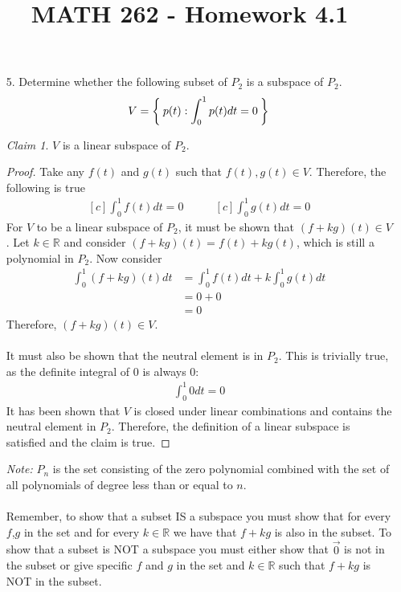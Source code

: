 \documentclass[letterpaper,12pt]{article}
\author{}
\title{MATH 262 - Homework 4.1}
\date{} %
\theoremstyle{remark}
\newtheorem*{claim}{Claim}
\begin{document}
\maketitle

\begin{enumerate}
  \item[5.]
    Determine whether the following subset of $P_2$ is a subspace of $P_2$.
    \begin{align*}
      V = \Set{p(t): \int_0^1 p(t)dt = 0}
    \end{align*}
    \begin{claim}
      $V$ is a linear subspace of $P_2$.
    \end{claim}
    \begin{proof}
      Take any $f(t)$ and $g(t)$ such that $f(t),g(t) \in V$. Therefore, the following is true
      \begin{equation*}
        \begin{aligned}[c]
          \int_0^1 f(t)dt = 0
        \end{aligned}
        \qquad
        \begin{aligned}[c]
          \int_0^1 g(t)dt = 0
        \end{aligned}
      \end{equation*}
      For $V$ to be a linear subspace of $P_2$, it must be shown that $(f + kg)(t) \in V$. Let $k \in \mathbb{R}$ and consider $(f + kg)(t) = f(t) + kg(t)$, which is still a polynomial in $P_2$. Now consider
      \begin{align*}
        \int_0^1 (f + kg)(t)dt &= \int_0^1 f(t)dt + k\int_0^1 g(t)dt \\
        &= 0 + 0 \\
        &= 0
      \end{align*}
      Therefore, $(f + kg)(t) \in V$. \\
      \\
      It must also be shown that the neutral element is in $P_2$. This is trivially true, as the definite integral of 0 is always 0:
      \begin{align*}
        \int_0^1 0dt = 0
      \end{align*}
      It has been shown that $V$ is closed under linear combinations and contains the neutral element in $P_2$. Therefore, the definition of a linear subspace is satisfied and the claim is true.
    \end{proof}
    \textit{Note:} $P_n$ is the set consisting of the zero polynomial combined with the set of all polynomials of degree less than or equal to $n$. \\
    \\
    Remember, to show that a subset IS a subspace you must show that for every $f$,$g$ in the set and for every $k \in \mathbb{R}$ we have that $f + kg$ is also in the subset. To show that a subset is NOT a subspace you must either show that $\vec{0}$ is not in the subset or give specific $f$ and $g$ in the set and $k \in \mathbb{R}$ such that $f + kg$ is NOT in the subset. \\
    \\
\end{enumerate}
\end{document}
